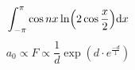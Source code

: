 \documentclass{ctexart}
\begin{document}
\begin{equation}
	\int_{-\pi}^{\pi}\cos{nx}\ln(2 \cos {x \over 2}){\mathrm d }x
\end{equation}
\begin{equation}
a_0 \propto F \propto \frac{1}{d} \exp(d \cdot e^\frac{-d}{1} )
\end{equation}
\begin{abstract}
	\lipsum[1]
\end{abstract}
\end{document}
